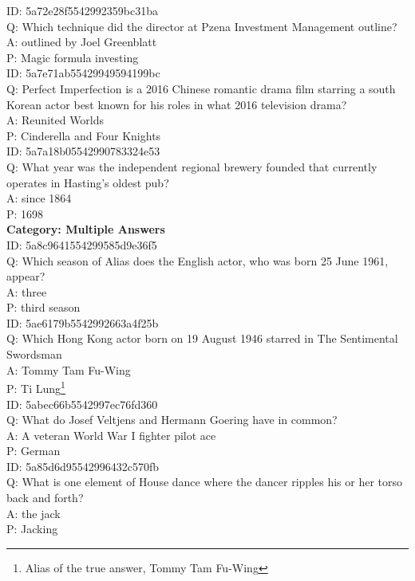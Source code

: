 \documentclass[11pt,a4paper]{article}
\begin{document}
\noindent ID: 5a72e28f5542992359bc31ba \\
Q: Which technique did the director at Pzena Investment Management outline? \\
A: outlined by Joel Greenblatt \\
P: Magic formula investing \\

\noindent ID: 5a7e71ab55429949594199bc \\
Q: Perfect Imperfection is a 2016 Chinese romantic drama film starring a south Korean actor best known for his roles in what 2016 television drama? \\
A: Reunited Worlds \\
P: Cinderella and Four Knights \\

\noindent ID: 5a7a18b05542990783324e53 \\
Q: What year was the independent regional brewery founded that currently operates in Hasting's oldest pub? \\
A: since 1864 \\
P: 1698 \\

\noindent \textbf{Category: Multiple Answers} \\
ID: 5a8c9641554299585d9e36f5 \\
Q: Which season of Alias does the English actor, who was born 25 June 1961, appear? \\
A: three \\
P: third season \\

\noindent ID: 5ae6179b5542992663a4f25b \\
Q: Which Hong Kong actor born on 19 August 1946 starred in The Sentimental Swordsman \\
A: Tommy Tam Fu-Wing \\
P: Ti Lung\footnote{Alias of the true answer, Tommy Tam Fu-Wing} \\

\noindent ID: 5abec66b5542997ec76fd360 \\
Q: What do Josef Veltjens and Hermann Goering have in common? \\
A: A veteran World War I fighter pilot ace \\
P: German \\

\noindent ID: 5a85d6d95542996432c570fb \\
Q: What is one element of House dance where the dancer ripples his or her torso back and forth? \\
A: the jack \\
P: Jacking \\
\end{document}
